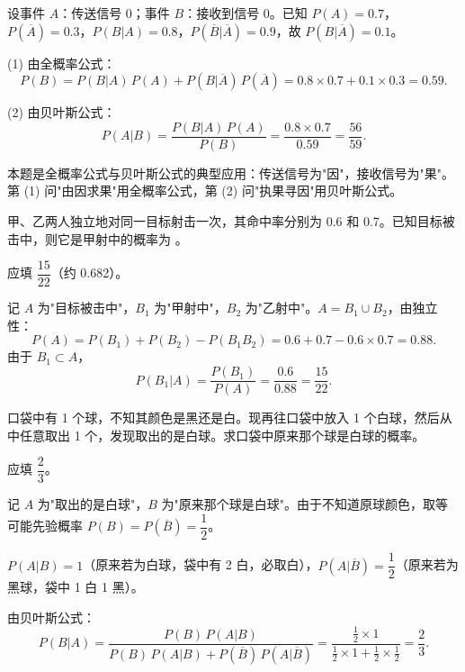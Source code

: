 \documentclass[lang=cn,11pt]{elegantbook}
\begin{document}
\begin{solution}
设事件 \(A\)：传送信号 0；事件 \(B\)：接收到信号 0。已知 \(P(A) = 0.7\)，\(P(\overline{A}) = 0.3\)，\(P(B|A) = 0.8\)，\(P(\overline{B}|\overline{A}) = 0.9\)，故 \(P(B|\overline{A}) = 0.1\)。

(1) 由全概率公式：
\[P(B) = P(B|A)\,P(A) + P(B|\overline{A})\,P(\overline{A}) = 0.8 \times 0.7 + 0.1 \times 0.3 = 0.59.\]

(2) 由贝叶斯公式：
\[P(A|B) = \frac{P(B|A)\,P(A)}{P(B)} = \frac{0.8 \times 0.7}{0.59} = \frac{56}{59}.\]
\end{solution}

\begin{note}
本题是全概率公式与贝叶斯公式的典型应用：传送信号为"因"，接收信号为"果"。第 (1) 问"由因求果"用全概率公式，第 (2) 问"执果寻因"用贝叶斯公式。
\end{note}

\begin{exercise}\label{exer:1-39}
甲、乙两人独立地对同一目标射击一次，其命中率分别为 0.6 和 0.7。已知目标被击中，则它是甲射中的概率为 \underline{\hspace{2cm}}。
\end{exercise}

\begin{solution}
应填 \(\dfrac{15}{22}\)（约 0.682）。

记 \(A\) 为"目标被击中"，\(B_1\) 为"甲射中"，\(B_2\) 为"乙射中"。\(A = B_1\cup B_2\)，由独立性：
\[P(A) = P(B_1)+P(B_2)-P(B_1B_2) = 0.6+0.7-0.6\times 0.7 = 0.88.\]
由于 \(B_1\subset A\)，
\[P(B_1|A) = \frac{P(B_1)}{P(A)} = \frac{0.6}{0.88} = \frac{15}{22}.\]
\end{solution}

\begin{exercise}\label{exer:1-40}
口袋中有 1 个球，不知其颜色是黑还是白。现再往口袋中放入 1 个白球，然后从中任意取出 1 个，发现取出的是白球。求口袋中原来那个球是白球的概率。
\end{exercise}

\begin{solution}
应填 \(\dfrac{2}{3}\)。

记 \(A\) 为"取出的是白球"，\(B\) 为"原来那个球是白球"。由于不知道原球颜色，取等可能先验概率 \(P(B)=P(\overline{B})=\dfrac{1}{2}\)。

\(P(A|B)=1\)（原来若为白球，袋中有 2 白，必取白），\(P(A|\overline{B})=\dfrac{1}{2}\)（原来若为黑球，袋中 1 白 1 黑）。

由贝叶斯公式：
\[P(B|A) = \frac{P(B)\,P(A|B)}{P(B)\,P(A|B)+P(\overline{B})\,P(A|\overline{B})} = \frac{\frac{1}{2}\times 1}{\frac{1}{2}\times 1+\frac{1}{2}\times\frac{1}{2}} = \frac{2}{3}.\]
\end{solution}
\end{document}
